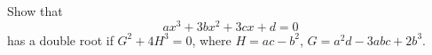 Show that
\[
ax^{3} + 3bx^{2} + 3cx + d = 0
\]
has a double root if $G^{2} + 4H^{3} = 0$, where $H = ac - b^{2}$, $G = a^{2}d - 3abc + 2b^{3}$.

